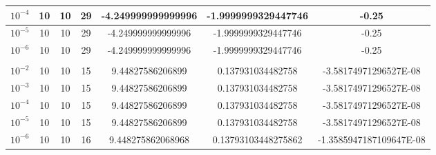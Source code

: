 \documentclass[12pt]{article}
\begin{document}
\begin{table}[H]
\begin{tabular}{|c|c|c|c|c|c|c|}
$10^{-4}$ & 10 & 10 & 29    & -4.249999999999996  & -1.9999999329447746 & -0.25                   \\ \hline
$10^{-5}$ & 10 & 10 & 29    & -4.249999999999996  & -1.9999999329447746 & -0.25                   \\ \hline
$10^{-6}$ & 10 & 10 & 29    & -4.249999999999996  & -1.9999999329447746 & -0.25                   \\ \hline
\rowcolor[HTML]{FFF0DB} 
\multicolumn{7}{|c|}{\cellcolor[HTML]{EDE9E2}$29x^2+18y^2-8x+10$}                                 \\ \hline
$10^{-2}$ & 10 & 10 & 15    & 9.44827586206899    & 0.137931034482758   & -3.58174971296527E-08   \\ \hline
$10^{-3}$ & 10 & 10 & 15    & 9.44827586206899    & 0.137931034482758   & -3.58174971296527E-08   \\ \hline
$10^{-4}$ & 10 & 10 & 15    & 9.44827586206899    & 0.137931034482758   & -3.58174971296527E-08   \\ \hline
$10^{-5}$ & 10 & 10 & 15    & 9.44827586206899    & 0.137931034482758   & -3.58174971296527E-08   \\ \hline
$10^{-6}$ & 10 & 10 & 16    & 9.448275862068968   & 0.13793103448275862 & -1.3585947187109647E-08 \\ \hline
\end{tabular}
\end{table}
\end{document}
